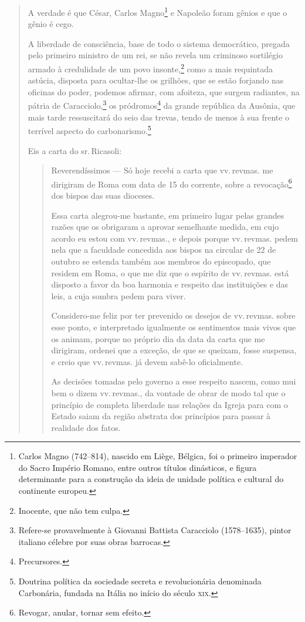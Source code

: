 \begin{quote}
A verdade é que César, Carlos Magno\footnote{Carlos Magno (742--814),
  nascido em Liège, Bélgica, foi o primeiro imperador do Sacro Império
  Romano, entre outros títulos dinásticos, e figura determinante para a
  construção da ideia de unidade política e cultural do continente
  europeu.} e Napoleão foram gênios e que o gênio é cego.

A liberdade de consciência, base de todo o sistema democrático, pregada
pelo primeiro ministro de um rei, se não revela um criminoso sortilégio
armado à credulidade de um povo insonte,\footnote{Inocente, que não tem
  culpa.} como a mais requintada astúcia, disposta para ocultar-lhe os
grilhões, que se estão forjando nas oficinas do poder, podemos afirmar,
com afoiteza, que surgem radiantes, na pátria de Caracciolo,\footnote{
  Refere-se provavelmente à Giovanni Battista Caracciolo (1578--1635),
  pintor italiano célebre por suas obras barrocas.} os
pródromos\footnote{Precursores.} da grande república da Ausônia, que
mais tarde ressuscitará do seio das trevas, tendo de menos à sua frente
o terrível aspecto do carbonarismo.\footnote{Doutrina política da
  sociedade secreta e revolucionária denominada Carbonária, fundada na
  Itália no início do século \textsc{xix}.}

Eis a carta do sr.\,Ricasoli:

\begin{quote}
Reverendíssimos --- Só hoje recebi a carta que vv.\,revmas. me dirigiram
de Roma com data de 15 do corrente, sobre a revocação\footnote{
  Revogar, anular, tornar sem efeito.} dos bispos das suas dioceses.

Essa carta alegrou-me bastante, em primeiro lugar pelas grandes razões
que os obrigaram a aprovar semelhante medida, em cujo acordo eu estou
com vv.\,revmas., e depois porque vv.\,revmas. pedem nela que a faculdade
concedida aos bispos na circular de 22 de outubro se estenda também aos
membros do episcopado, que residem em Roma, o que me diz que o espírito
de vv.\,revmas. está disposto a favor da boa harmonia e respeito das
instituições e das leis, a cuja sombra pedem para viver.

Considero-me feliz por ter prevenido os desejos de vv.\,revmas. sobre
esse ponto, e interpretado igualmente os sentimentos mais vivos que os
animam, porque no próprio dia da data da carta que me dirigiram, ordenei
que a exceção, de que se queixam, fosse suspensa, e creio que vv.\,revmas. já devem sabê-lo oficialmente.

As decisões tomadas pelo governo a esse respeito nascem, como mui bem o
dizem vv.\,revmas., da vontade de obrar de modo tal que o princípio de
completa liberdade nas relações da Igreja para com o Estado saiam da
região abstrata dos princípios para passar à realidade dos fatos.


\end{quote}
\end{quote}
